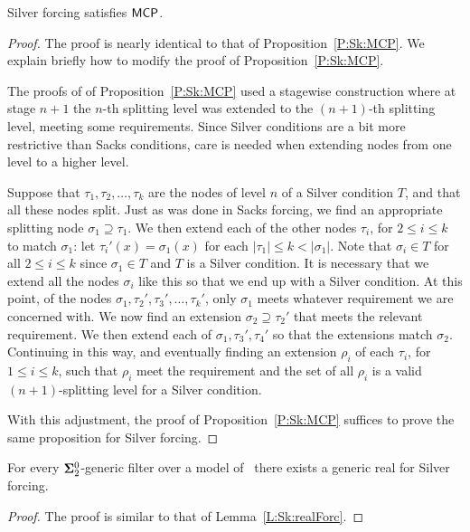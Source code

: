 \begin{prop}[\ACAo]\label{P:Sl:MCP}
Silver forcing satisfies $\mathsf{MCP}$.
\end{prop}
\begin{proof}
The proof is nearly identical to that of Proposition~\ref{P:Sk:MCP}.
We explain briefly how to modify the proof of Proposition~\ref{P:Sk:MCP}.

The proofs of of Proposition~\ref{P:Sk:MCP} used a stagewise
construction where at stage $n+1$ the $n$-th splitting
level was extended to the $(n+1)$-th splitting level, meeting some requirements.
Since Silver conditions are a bit more restrictive than Sacks conditions,
care is needed when extending nodes from one level to a higher level.

Suppose that $\tau_1,\tau_2,\ldots,\tau_k$ are the nodes of level $n$
of a Silver condition $T$, and that all these nodes split.
Just as was done in Sacks forcing,
we find an appropriate splitting node $\sigma_1\supseteq\tau_1$.
We then extend each of the other nodes $\tau_i$, for $2\leq i\leq k$
to match $\sigma_1$: let $\tau_i'(x)=\sigma_1(x)$ for each $|\tau_1|\leq k<|\sigma_1|$.
Note that $\sigma_i\in T$ for all $2\leq i\leq k$ since
$\sigma_1\in T$ and $T$ is a Silver condition.
It is necessary that we extend all the nodes $\sigma_i$
like this so that we end up with a Silver condition.
At this point, of the nodes $\sigma_1, \tau_2',\tau_3',\ldots,\tau_k'$,
only $\sigma_1$ meets whatever requirement we are concerned with.
We now find an extension $\sigma_2\supseteq\tau_2'$ that meets the relevant requirement.
We then extend each of $\sigma_1,\tau_3',\tau_4'$ so that the extensions match $\sigma_2$.
Continuing in this way, and eventually finding an extension $\rho_i$ of each $\tau_i$,
for $1\leq i\leq k$, such that $\rho_i$ meet the requirement and the set of all $\rho_i$
is a valid $(n+1)$-splitting level for a Silver condition.

With this adjustment, the proof of Proposition~\ref{P:Sk:MCP} suffices to prove
the same proposition for Silver forcing.
\end{proof}

\begin{lem}\label{L:Sl:realForc}
For every $\mathbf{\Sigma}^0_2$-generic filter over a model of \RCAo\
there exists a generic real for Silver forcing.
\end{lem}
\begin{proof}
The proof is similar to that of Lemma~\ref{L:Sk:realForc}.
\end{proof}

